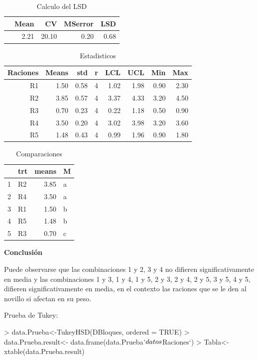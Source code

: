 \documentclass[12pt,letterpaper]{report}
\begin{document}
\begin{table}[ht]
\centering
\begin{tabular}{rrrrr}
  \hline
 & Mean & CV & MSerror & LSD \\ 
  \hline
  & 2.21 & 20.10 & 0.20 & 0.68 \\ 
   \hline
\end{tabular}
\caption{Calculo del LSD}
\end{table}

\begin{table}[ht]
\centering
\begin{tabular}{rrrrrrrr}
  \hline
  Raciones  & Means & std & r & LCL & UCL & Min & Max \\ 
  \hline
  R1 & 1.50 & 0.58 &   4 & 1.02 & 1.98 & 0.90 & 2.30 \\ 
  R2 & 3.85 & 0.57 &   4 & 3.37 & 4.33 & 3.20 & 4.50 \\ 
  R3 & 0.70 & 0.23 &   4 & 0.22 & 1.18 & 0.50 & 0.90 \\ 
  R4 & 3.50 & 0.20 &   4 & 3.02 & 3.98 & 3.20 & 3.60 \\ 
  R5 & 1.48 & 0.43 &   4 & 0.99 & 1.96 & 0.90 & 1.80 \\ 
   \hline
\end{tabular}
\caption{Estadisticos}
\end{table}

\begin{table}[ht]
\centering
\begin{tabular}{rlrl}
  \hline
  & trt & means & M \\ 
  \hline
  1 & R2 & 3.85 & a \\ 
  2 & R4 & 3.50 & a \\ 
  3 & R1 & 1.50 & b \\ 
  4 & R5 & 1.48 & b \\ 
  5 & R3 & 0.70 & c \\ 
   \hline
\end{tabular}
\caption{Comparaciones}
\end{table}
\newpage
\textbf{Conclusión}

Puede observarse que las combinaciones 1 y 2, 3 y 4 no difieren significativamente en media y las combinaciones 1 y 3, 1 y 4, 1 y 5, 2 y 3, 2 y 4, 2 y 5, 3 y 5, 4 y 5, difieren significativamente en media, en el contexto las raciones que se le den al novillo si afectan en su peso.  

Prueba de Tukey:
\begin{Schunk}
\begin{Sinput}
> data.Prueba<-TukeyHSD(DBloques, ordered = TRUE)
> data.Prueba.result<- data.frame(data.Prueba$`datos$Raciones`)
> Tabla<- xtable(data.Prueba.result)
\end{Sinput}
\end{Schunk}
\end{document}
